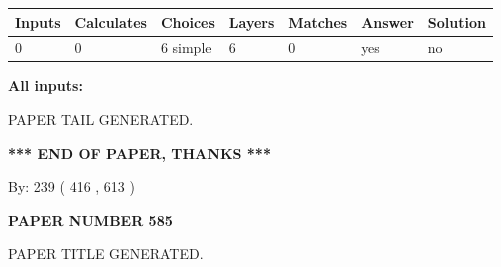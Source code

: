 \documentclass{ctexart}
\begin{document}
 
   
   
   
   
\noindent\begin{tabular}{|l|l|l|l|l|l|l|}
 \hline
Inputs & Calculates & Choices & Layers & Matches & Answer & Solution \\ \hline
 0  & 
 0  & 
 6
  simple  
  & 
 6  & 
 0  & 
  yes & 
  no 
  \\ \hline
 \end{tabular}
   
   
   
   
\noindent{}
   
   
   
   
\noindent\vspace{0.1in}\hspace{-0.08in} {\textbf{\Large{All inputs: }}}
   
   
   
   
   
   
 \vspace{0.2in}
 
   
   
\vspace{2.0in} PAPER TAIL GENERATED.
   
   
   
   
\vspace{1.0in} 
{\textbf{\large{ *** END OF PAPER, THANKS *** }}} 
   
   
\hspace{1.0in} By: 
 239 ( 416 ,  613 )
   
   
   
   
\newpage 
\setcounter{page}{ 
   585001 } 
   
   
   
   
 {\textbf{ \Large{ PAPER NUMBER  585  }}}
   
   
\vspace{0.2in}
   
   
   
   
   
   
   
   
 \vspace{0.2in}
 
 
 
 
   
   
 PAPER TITLE GENERATED.
   
\end{document}
